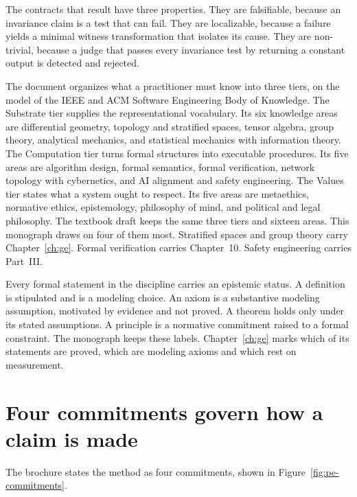The contracts that result have three properties.
They are falsifiable, because an invariance claim is a test that can fail. They are localizable,
because a failure yields a minimal witness transformation that isolates its cause. They are
non-trivial, because a judge that passes every invariance test by returning a constant output is
detected and rejected.

The document organizes what a practitioner must know into three tiers, on the model of the IEEE
and ACM Software Engineering Body of Knowledge.
The Substrate tier supplies the representational vocabulary. Its six knowledge areas are
differential geometry, topology and stratified spaces, tensor algebra, group theory, analytical
mechanics, and statistical mechanics with information theory. The Computation tier turns formal
structures into executable procedures. Its five areas are algorithm design, formal semantics,
formal verification, network topology with cybernetics, and AI alignment and safety engineering.
The Values tier states what a system ought to respect. Its five areas are metaethics, normative
ethics, epistemology, philosophy of mind, and political and legal philosophy.
The textbook draft keeps the same three tiers and sixteen areas.
This monograph draws on four of them most. Stratified spaces and group theory carry
Chapter~\ref{ch:ge}. Formal verification carries Chapter~10. Safety engineering carries Part~III.

Every formal statement in the discipline carries an epistemic status.
A definition is stipulated and is a modeling choice. An axiom is a substantive modeling
assumption, motivated by evidence and not proved. A theorem holds only under its stated
assumptions. A principle is a normative commitment raised to a formal constraint. The monograph
keeps these labels. Chapter~\ref{ch:ge} marks which of its statements are proved, which are
modeling axioms and which rest on measurement.

\section{Four commitments govern how a claim is made}\label{sec:pe-commitments}

The brochure states the method as four commitments, shown in
Figure~\ref{fig:pe-commitments}.

